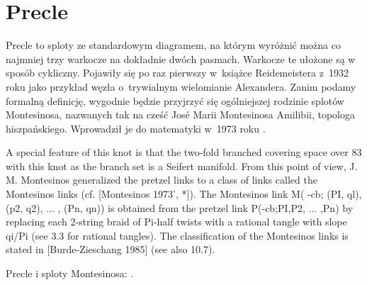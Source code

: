 
\section{Precle}
%
%
Precle to sploty ze standardowym diagramem, na którym wyróżnić można co najmniej trzy warkocze na dokładnie dwóch pasmach.
Warkocze te ułożone są w sposób cykliczny.
Pojawiły się po raz pierwszy w~książce Reidemeistera z~1932 roku jako przykład węzła o~trywialnym wielomianie Alexandera.
Zanim podamy formalną definicję, wygodnie będzie przyjrzyć się ogólniejszej rodzinie splotów Montesinosa, nazwanych tak na cześć José Marii Montesinosa Amilibii, topologa hiszpańskiego.
%
Wprowadził je do matematyki w~1973 roku \cite{montesinos73}.

\begin{tobedone}
A special feature of this knot is that the two-fold branched covering space over 83 with this knot as the branch set is a Seifert manifold. From this point of view, J. M. Montesinos generalized the pretzel links to a class of links called the Montesinos links (cf. [Montesinos 1973', *]). The Montesinos link M( -cb; (PI, ql), (p2, q2), ... , (Pn, qn)) is obtained from the pretzel link P(-cb;PI,P2, ... ,Pn) by replacing each 2-string braid of Pi-half twists with a rational tangle with slope qi/Pi (see 3.3 for rational tangles). The classification of the Montesinos links is stated in [Burde-Zieschang 1985] (see also 10.7).
\end{tobedone}

\begin{tobedone}
    Precle i sploty Montesinosa: \cite[s. 27]{kawauchi96}.
\end{tobedone}

